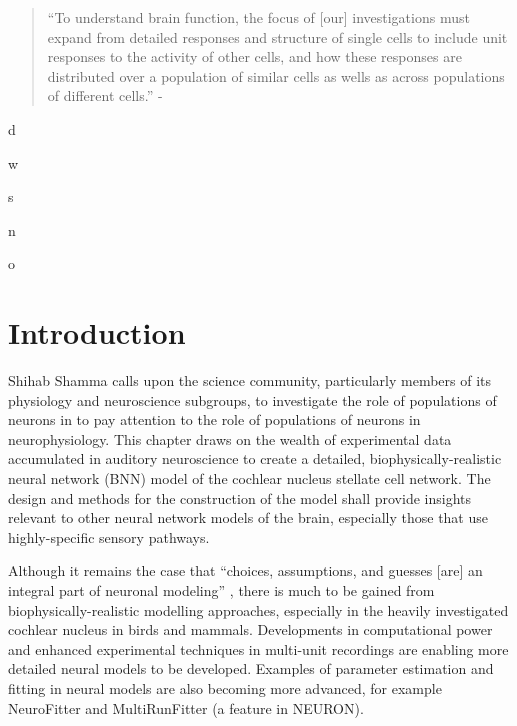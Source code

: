 
\begin{quotation}
  ``To understand brain function, the focus of [our] investigations must expand
  from detailed responses and structure of single cells to include unit
  responses to the activity of other cells, and how these responses are
  distributed over a population of similar cells as wells as across populations
  of different cells.''  - \textit{\citet[p.]{Shamma:1998}}
\end{quotation}

\gls{d}


\gls{w}


\gls{s}


\gls{n}


\gls{o}

\section{Introduction}\label{sec:CN:introduction}

Shihab Shamma calls upon the science community, particularly members of its
physiology and neuroscience subgroups, to investigate the role of populations of
neurons in to pay attention to the role of populations of neurons in
neurophysiology. This chapter draws on the wealth of experimental data
accumulated in auditory neuroscience to create a detailed,
biophysically-realistic neural network (BNN) model of the cochlear nucleus
stellate cell network. The design and methods for the construction of the model
shall provide insights relevant to other neural network models of the brain,
especially those that use highly-specific sensory pathways.  

\smallskip{}

Although it remains the case that ``choices, assumptions, and guesses [are] an
integral part of neuronal modeling'' \citep{SegevBurkeEtAl:1998}
, there is much to be gained from biophysically-realistic
modelling approaches, especially in the heavily investigated cochlear nucleus in
birds and mammals. Developments in computational power and enhanced experimental
techniques in multi-unit recordings are enabling more detailed neural models to
be developed. Examples of parameter estimation and fitting in neural models are
also becoming more advanced, for example NeuroFitter \citep{VanAchardEtAl:2007}
and MultiRunFitter (a feature in NEURON).

